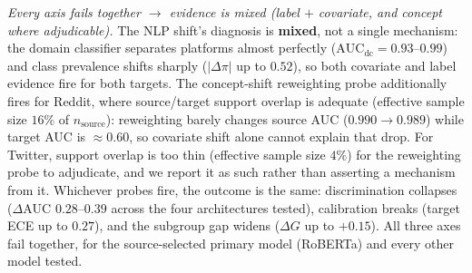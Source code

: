 \documentclass[11pt]{article}
\begin{document}
\emph{Every axis fails together $\rightarrow$ evidence is mixed (label $+$ covariate, and concept
where adjudicable).} The NLP shift's diagnosis is \textbf{mixed}, not a single mechanism: the domain
classifier
separates platforms almost perfectly ($\text{AUC}_{\text{dc}} = 0.93$--$0.99$) and class prevalence
shifts sharply ($|\Delta\pi|$ up to $0.52$), so both covariate and label evidence fire for both
targets. The concept-shift reweighting probe additionally fires for Reddit, where source/target
support overlap is adequate (effective sample size $16\%$ of $n_{\text{source}}$): reweighting
barely changes source AUC ($0.990\rightarrow 0.989$) while target AUC is $\approx 0.60$, so
covariate shift alone cannot explain that drop. For Twitter, support overlap is too thin
(effective sample size $4\%$) for the reweighting probe to adjudicate, and we report it as such
rather than asserting a mechanism from it. Whichever probes fire, the outcome is the same:
discrimination collapses ($\Delta\text{AUC}$ $0.28$--$0.39$ across the four architectures tested),
calibration breaks (target ECE up to $0.27$), and the subgroup gap widens ($\Delta G$ up to
$+0.15$). All three axes fail together, for the source-selected primary model (RoBERTa) and every
other model tested.
\end{document}
